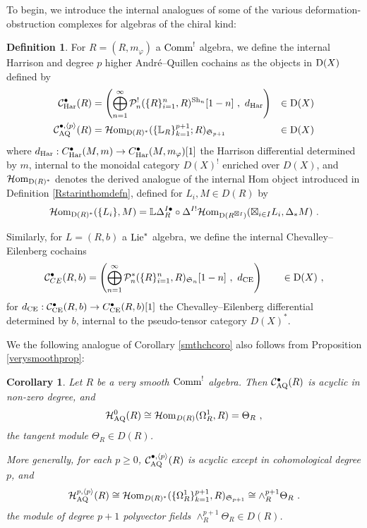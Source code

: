 \documentclass[11pt]{amsart}
\numberwithin{equation}{section}
\newtheorem{coro}[theo]{Corollary}
\theoremstyle{definition}
\newtheorem{defn}[theo]{Definition}
\newcommand{\bb}{\mathbb}
\newcommand{\mc}{\mathcal}
\newcommand{\mf}{\mathfrak}
\newcommand{\Har}{{\textup{Har}}}
\newcommand{\AQ}{{\textup{AQ}}}
\newcommand{\bL}{{\mathbb{L}}}
\newcommand{\CE}{{\textup{CE}}}
\newcommand{\Sh}{{\textup{Sh}}}
\newcommand{\Comm}{{\textup{Comm}}}
\newcommand{\Lie}{{\textup{Lie}}}
\newcommand{\Homi}{{\mc H\textup{om}}}
\newcommand{\Ss}{{{\mf{S}}}}
\newcommand{\0}{{\textbf{0}}}
\newcommand{\Dd}{{\textup{D}}}
\newcommand{\DD}{{D}}
\def \mf{\mathfrak}
\begin{document}
To begin, we introduce the internal analogues of some of the various deformation-obstruction complexes for algebras of the chiral kind:


\begin{defn}For $R=(R,m_\varphi)$ a $\Comm^!$ algebra, we define the internal Harrison and degree $p$ higher Andr\'e--Quillen cochains as the objects in $\Dd(X)$ defined by
\begin{align*}
	 \mc C^\bullet_{\Har}(R) & = \left( \bigoplus_{n=1}^\infty  \mc P_n^!(\{R\}_{i=1}^n , R)^{\Sh_n}[1-n] \ , \ d_\textup{Har} \right)  &  \in \Dd(X) \\
	 \mc C^{\bullet,\langle p \rangle}_\AQ(R) & = \Homi_{\Dd(R)^*}(\{\bL_R\}_{k=1}^{p+1};R)_{\Ss_{p+1}} &  \in \Dd(X) 
\end{align*}
where $d_\text{Har}:C^\bullet_{\Har}(M,m) \to C^\bullet_{\Har}(M,m_\varphi)[1]$ the Harrison differential determined by $m$, internal to the monoidal category $\DD(X)^!$ enriched over $\DD(X)$, and $\Homi_{\Dd(R)^*}$ denotes the derived analogue of the internal Hom object introduced in Definition \ref{Rstarinthomdefn}, defined for $L_i,M \in \DD(R)$ by
	\[ \Homi_{\Dd(R)^*}(\{L_i\},M)= \bb L \Delta_R^{I\bullet} \circ \Delta^{I!} \Homi_{\Dd(R^{\boxtimes I })}(\boxtimes_{i\in I} L_i, \Delta_*M) \ . \]

Similarly, for $L=(R,b)$ a $\Lie^*$ algebra, we define the internal Chevalley--Eilenberg cochains 
\[ \mc C^\bullet_{CE}(R,b) = \left( \bigoplus_{n=1}^\infty   \mc P_n^*(\{ R\}_{i=1}^n,R)_{\Ss_n}[1-n] \ , \ d_\text{CE} \right) \qquad  \in \Dd(X)   \  , 
\]
for $d_\text{CE}:\mc C^\bullet_{\CE}(R,b)\to C^\bullet_{\CE}(R,b)[1]$ the Chevalley--Eilenberg differential determined by $b$, internal to the pseudo-tensor category $\DD(X)^*$.

\end{defn}

We the following analogue of Corollary \ref{smthchcoro} also follows from Proposition \ref{verysmoothprop}:

\begin{coro}\label{smthchintcoro} Let $R$ be a very smooth $\Comm^!$ algebra. Then $\mc C^\bullet_\AQ(R)$ is acyclic in non-zero degree, and
	\[ \mc H^0_\AQ(R)\cong \Homi_{\DD(R)}(\Omega^1_R,R) = \Theta_R  \ , \]
	the tangent module $\Theta_R  \in \DD(R)$.
	
	More generally, for each $p\geq 0$, $\mc C^{\bullet,\langle p \rangle }_\AQ(R)$ is acyclic except in cohomological degree $p$, and
	\[ \mc H^{p,\langle p \rangle}_\AQ(R)\cong \Homi_{\DD(R)^*}(\{\Omega^1_R\}_{k=1}^{p+1},R)_{\Ss_{p+1}} \cong \wedge^{p+1}_R \Theta_R \ . \]
the module of degree ${p+1}$ polyvector fields $\wedge^{p+1}_R \Theta_R \in \DD(R)$.
\end{coro}
\end{document}
